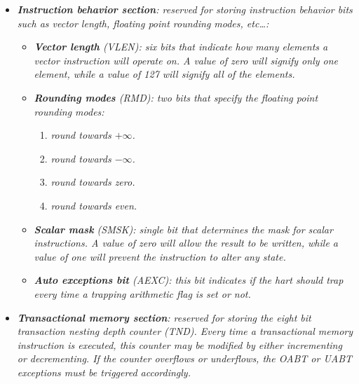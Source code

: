 \documentclass{article}
\begin{document}
                \begin{itemize}

                    \item \textit{\textbf{Instruction behavior section}: reserved for storing instruction behavior bits such as vector length, floating point rounding modes, etc\ldots:}

                        \begin{itemize}

                            \item \textit{\textbf{Vector length} (VLEN): six bits that indicate how many elements a vector instruction will operate on. A value of zero will signify only one element, while a value of 127 will signify all of the elements.}

                            \item \textit{\textbf{Rounding modes} (RMD): two bits that specify the floating point rounding modes:}

                                \begin{enumerate}

                                    \item \textit{round towards \(+\infty\).}
                                    \item \textit{round towards \(-\infty\).}
                                    \item \textit{round towards zero.}
                                    \item \textit{round towards even.}

                                \end{enumerate}

                            \item \textit{\textbf{Scalar mask} (SMSK): single bit that determines the mask for scalar instructions. A value of zero will allow the result to be written, while a value of one will prevent the instruction to alter any state.}

                            \item \textit{\textbf{Auto exceptions bit} (AEXC): this bit indicates if the hart should trap every time a trapping arithmetic flag is set or not.}

                        \end{itemize}

                    \item \textit{\textbf{Transactional memory section}: reserved for storing the eight bit transaction nesting depth counter (TND). Every time a transactional memory instruction is executed, this counter may be modified by either incrementing or decrementing. If the counter overflows or underflows, the OABT or UABT exceptions must be triggered accordingly.}


\end{itemize}
\end{document}
